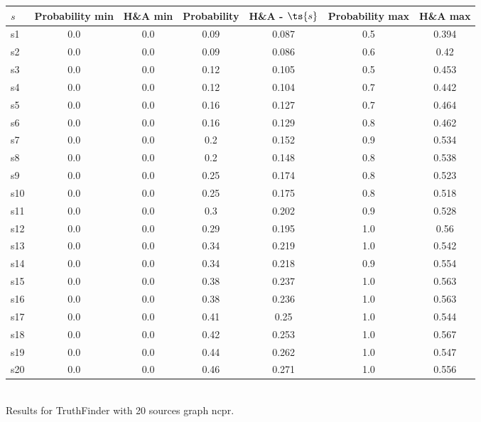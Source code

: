 \documentclass{article}
\begin{document}
\noindent\begin{tabular}{|l|c|c|c|c|c|c|}
\hline
$s$& Probability min & H\&A min & Probability & H\&A - $\ts{s}$ & Probability max & H\&A max\\
\hline
s1 &0.0 & 0.0 & 0.09 & 0.087 & 0.5 & 0.394\\
\hline
s2 &0.0 & 0.0 & 0.09 & 0.086 & 0.6 & 0.42\\
\hline
s3 &0.0 & 0.0 & 0.12 & 0.105 & 0.5 & 0.453\\
\hline
s4 &0.0 & 0.0 & 0.12 & 0.104 & 0.7 & 0.442\\
\hline
s5 &0.0 & 0.0 & 0.16 & 0.127 & 0.7 & 0.464\\
\hline
s6 &0.0 & 0.0 & 0.16 & 0.129 & 0.8 & 0.462\\
\hline
s7 &0.0 & 0.0 & 0.2 & 0.152 & 0.9 & 0.534\\
\hline
s8 &0.0 & 0.0 & 0.2 & 0.148 & 0.8 & 0.538\\
\hline
s9 &0.0 & 0.0 & 0.25 & 0.174 & 0.8 & 0.523\\
\hline
s10 &0.0 & 0.0 & 0.25 & 0.175 & 0.8 & 0.518\\
\hline
s11 &0.0 & 0.0 & 0.3 & 0.202 & 0.9 & 0.528\\
\hline
s12 &0.0 & 0.0 & 0.29 & 0.195 & 1.0 & 0.56\\
\hline
s13 &0.0 & 0.0 & 0.34 & 0.219 & 1.0 & 0.542\\
\hline
s14 &0.0 & 0.0 & 0.34 & 0.218 & 0.9 & 0.554\\
\hline
s15 &0.0 & 0.0 & 0.38 & 0.237 & 1.0 & 0.563\\
\hline
s16 &0.0 & 0.0 & 0.38 & 0.236 & 1.0 & 0.563\\
\hline
s17 &0.0 & 0.0 & 0.41 & 0.25 & 1.0 & 0.544\\
\hline
s18 &0.0 & 0.0 & 0.42 & 0.253 & 1.0 & 0.567\\
\hline
s19 &0.0 & 0.0 & 0.44 & 0.262 & 1.0 & 0.547\\
\hline
s20 &0.0 & 0.0 & 0.46 & 0.271 & 1.0 & 0.556\\
\hline
\end{tabular}\\

\noindent Results for TruthFinder with 20 sources graph ncpr.
\end{document}
